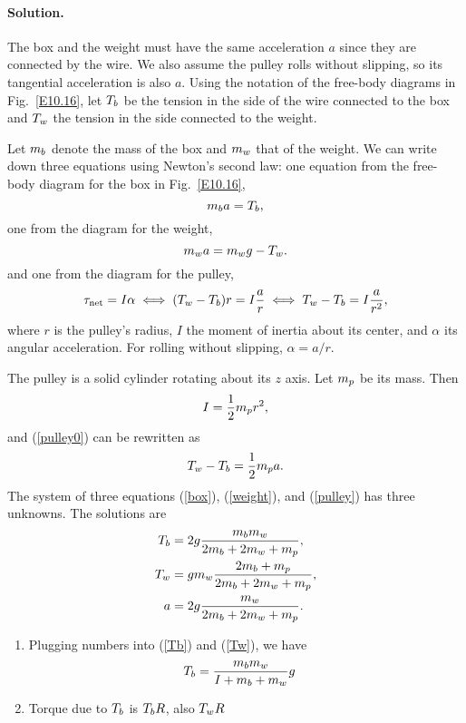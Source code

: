 \documentclass[11pt]{article}
\newcommand{\refeq}[1]{(\ref{#1})}
\newcommand{\beq}{\begin{equation*}}
\newcommand{\eeq}{\end{equation*}}
\newcommand{\beqn}{\begin{equation}}
\newcommand{\eeqn}{\end{equation}}
\newenvironment{solution}
{
    \paragraph{Solution.}
    \ignorespaces
}
{
    \bigskip
}
\begin{document}
\begin{solution}
	The box and the weight must have the same acceleration $a$ since they are connected by the wire.  We also assume the pulley rolls without slipping, so its tangential acceleration is also $a$.  Using the notation of the free-body diagrams in Fig.~\ref{E10.16}, let $T_b$ be the tension in the side of the wire connected to the box and $T_w$ the tension in the side connected to the weight.
	
	Let $m_b$ denote the mass of the box and $m_w$ that of the weight.  We can write down three equations using Newton's second law: one equation from the free-body diagram for the box in Fig.~\ref{E10.16},
			\beqn \label{box}
				\mb a = \Tb,
			\eeqn
			one from the diagram for the weight,
			\beqn \label{weight}
				\mw a = \mw g - \Tw.
			\eeqn
			and one from the diagram for the pulley,
			\beq
				\tnet = I \alpha \iff (\Tw - \Tb) r = I \frac{a}{r} \iff \Tw - \Tb = I \frac{a}{r^2},
			\eeq
			where $r$ is the pulley's radius, $I$ the moment of inertia about its center, and $\alpha$ its angular acceleration.  For rolling without slipping, $\alpha = a / r$.
			
			The pulley is a solid cylinder rotating about its $z$ axis.  Let $m_p$ be its mass.  Then
			\beq
				I = \frac{1}{2} \mmp r^2,
			\eeq
			and \refeq{pulley0} can be rewritten as
			\beqn \label{pulley}
				\Tw - \Tb = \frac{1}{2} \mmp a.
			\eeqn
			The system of three equations \refeq{box}, \refeq{weight}, and \refeq{pulley} has three unknowns.  The solutions are
			\begin{align}
				T_b &= 2g \frac{m_b m_w}{2 m_b + 2 m_w + m_p}, \label{Tb} \\
				T_w &= g m_w \frac{2 m_b + m_p}{2 m_b + 2 m_w + m_p}, \label{Tw} \\
				a &= 2g \frac{m_w}{2 m_b + 2 m_w + m_p}. \label{acc}
			\end{align}
			
			
			
	\begin{enumerate}
		\item Plugging numbers into \refeq{Tb} and \refeq{Tw}, we have
			\begin{align*}
				T_b &= \frac{m_b m_w}{I + m_b + m_w} g
			\end{align*}
		
		\item Torque due to $T_b$ is $T_b R$, also $T_w R$
	\end{enumerate}
	
\end{solution}
\end{document}
